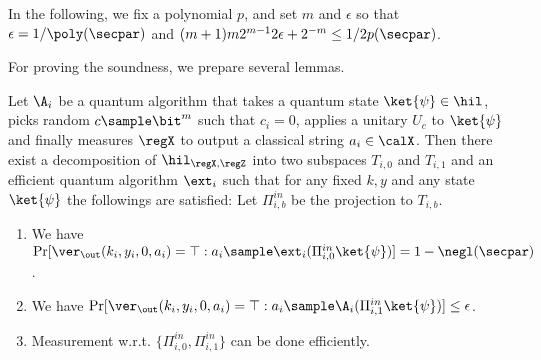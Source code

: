 In the following, we fix a polynomial $p$, and set $m$ and $\epsilon$ so that 
$\epsilon=1/\poly(\secpar)$ and  $(m+1)m2^{m-1}2\epsilon+2^{-m}\leq 1/2p(\secpar)$.




For proving the soundness, we prepare several lemmas.
\begin{lemma}\label{lem:decomp}
Let $\A_i$ be a quantum algorithm that takes a quantum state $\ket{\psi}\in \hil$, picks random $c\sample \bit^m$ such that $c_i=0$, applies a unitary $U_c$ to $\ket{\psi}$ and finally measures $\regX$ to output a classical string $a_i\in \calX$.
Then there exist a decomposition of $\hil_{\regX,\regZ}$ into two subspaces $T_{i,0}$ and $T_{i,1}$ and an efficient quantum algorithm $\ext_i$ such that for any fixed $k,y$ and any state $\ket{\psi}$ the followings are satisfied: Let $\Pi_{i,b}^{in}$ be the projection to $T_{i,b}$.
\begin{enumerate}
    \item
    We have $\Pr[\ver_\out(k_i,y_i,0,a_i)=\top: a_i\sample \ext_i(\Pi_{i,0}^{in}\ket{\psi})]=1-\negl(\secpar)$.
    \item We have $\Pr[\ver_\out(k_i,y_i,0,a_i)=\top:a_i\sample \A_i(\Pi_{i,1}^{in}\ket{\psi})]\leq \epsilon$.
    \item Measurement w.r.t. $\{\Pi_{i,0}^{in}, \Pi_{i,1}^{in}\}$ can be done efficiently.
\end{enumerate}
\end{lemma}


